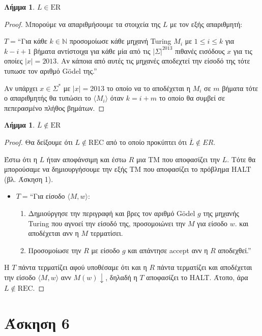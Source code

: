 \documentclass[a4paper, oneside, 11pt]{article}
\newtheorem{lm}[thm]{Λήμμα}
\theoremstyle{definition}
\begin{document}
\begin{lm}
$L \in \text{ER}$
\end{lm}
\begin{proof}
Μπορούμε να απαριθμήσουμε τα στοιχεία της $L$ με τον εξής απαριθμητή:

$T = $``Για κάθε $k \in \mathbb{N}$ προσομοίωσε κάθε μηχανή Turing $M_i$ με $1 \leq i
\leq k$ για $k-i+1$ βήματα αντίστοιχα για κάθε μία από τις $|\Sigma|^{2013}$ πιθανές
εισόδους $x$ για τις οποίες $|x| = 2013$. Αν κάποια από αυτές τις μηχανές αποδεχτεί
την είσοδό της τότε τυπωσε τον αριθμό G\"{o}del της.''

Αν υπάρχει $x \in \Sigma^*$ με $|x| = 2013$ το οποίο να το αποδέχεται η $M_i$ σε $m$
βήματα τότε ο απαριθμητής θα τυπώσει το $\langle M_i \rangle$ όταν $k = i+m$ το οποίο
θα συμβεί σε πεπερασμένο πλήθος βημάτων.
\end{proof}

\begin{lm}
$\overline{L} \notin \text{ER}$
\end{lm}
\begin{proof}
Θα δείξουμε ότι $L \notin \text{REC}$ από το οποίο προκύπτει ότι $\overline{L} \notin
ER$.

Έστω ότι η $L$ ήταν αποφάνσιμη και έστω $R$ μια TM που αποφασίζει την $L$.
Τότε θα μπορούσαμε να δημιουργήσουμε την εξής TM που αποφασίζει το πρόβλημα HALT (βλ.
Άσκηση 1).

\begin{itemize}
\item $T = $``Για είσοδο $\langle M, w \rangle$:
      \begin{enumerate}
      \item Δημιούργησε την περιγραφή και βρες τον αριθμό G\"{o}del $g$ της μηχανής
      Turing που αγνοεί την είσοδό της, προσομοιώνει την $M$ για είσοδο $w$.
      και αποδέχεται ανν η $M$ τερματίσει.
      \item Προσομοίωσε την $R$ με είσοδο $g$ και απάντησε accept ανν η $R$
      αποδεχθεί.''
      \end{enumerate}
\end{itemize}

Η $T$ πάντα τερματίζει αφού υποθέσαμε ότι και η $R$ πάντα τερματίζει και αποδέχεται
την είσοδο $\langle M, w \rangle$ ανν $M(w) \downarrow$, δηλαδή η $T$ αποφασίζει το
HALT. Άτοπο, άρα $L \notin \text{REC}$.
\end{proof}

\section*{Άσκηση 6}
\end{document}
